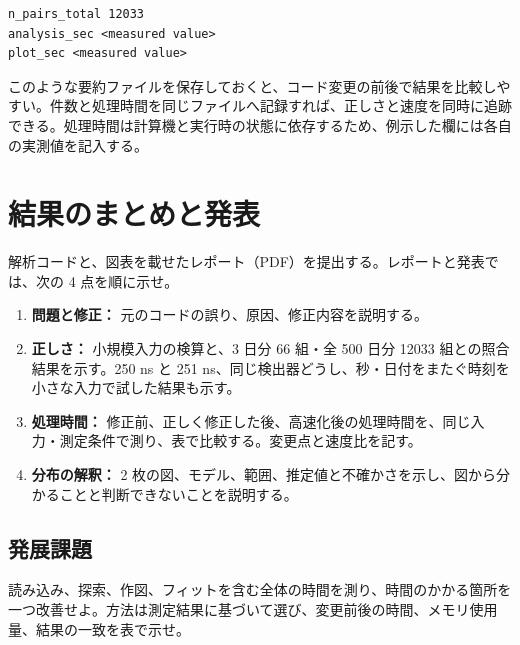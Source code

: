 \begin{lstlisting}[numbers=none, xleftmargin=2\zw]
n_pairs_total 12033
analysis_sec <measured value>
plot_sec <measured value>
\end{lstlisting}

このような要約ファイルを保存しておくと、コード変更の前後で結果を比較しやすい。件数と処理時間を同じファイルへ記録すれば、正しさと速度を同時に追跡できる。処理時間は計算機と実行時の状態に依存するため、例示した欄には各自の実測値を記入する。

\section{結果のまとめと発表}

解析コードと、図表を載せたレポート（PDF）を提出する。レポートと発表では、次の 4 点を順に示せ。

\begin{enumerate}
\item \textbf{問題と修正：} 元のコードの誤り、原因、修正内容を説明する。
\item \textbf{正しさ：} 小規模入力の検算と、3 日分 66 組・全 500 日分 12033 組との照合結果を示す。250 ns と 251 ns、同じ検出器どうし、秒・日付をまたぐ時刻を小さな入力で試した結果も示す。
\item \textbf{処理時間：} 修正前、正しく修正した後、高速化後の処理時間を、同じ入力・測定条件で測り、表で比較する。変更点と速度比を記す。
\item \textbf{分布の解釈：} 2 枚の図、モデル、範囲、推定値と不確かさを示し、図から分かることと判断できないことを説明する。
\end{enumerate}

\subsection{発展課題}

読み込み、探索、作図、フィットを含む全体の時間を測り、時間のかかる箇所を一つ改善せよ。方法は測定結果に基づいて選び、変更前後の時間、メモリ使用量、結果の一致を表で示せ。
